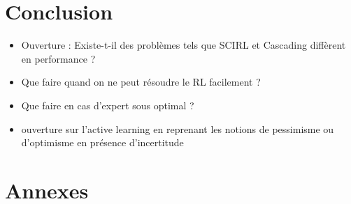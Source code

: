\documentclass[11pt]{article}
\begin{document}
\section{Conclusion}
\label{sec-8}

\begin{itemize}
\item Ouverture : Existe-t-il des problèmes tels que SCIRL et Cascading diffèrent en performance ?
\item Que faire quand on ne peut résoudre le RL facilement ?
\item Que faire en cas d'expert sous optimal ?
\item ouverture sur l'active learning en reprenant les notions de pessimisme ou d'optimisme en présence d'incertitude
\end{itemize}

\section{Annexes}
\label{sec-9}
\end{document}
